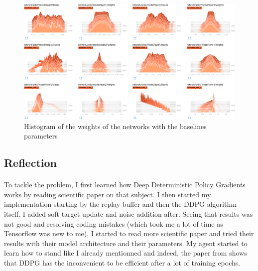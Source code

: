 \documentclass{article}
\begin{document}
\begin{figure}[ht]
  \centering
  \includegraphics[width=.8\textwidth]{histogram_baseline}
  \caption{Histogram of the weights of the networks with the baselines
    parameters}
  \label{fig:histogram_baseline}
\end{figure}

\subsection{Reflection}

\paragraph{}
To tackle the problem, I first learned how Deep Deterministic Policy Gradients works by reading
scientific paper on that subject. I then started my implementation starting by the replay buffer
and then the DDPG algorithm itself. I added soft target update and noise addition after. Seeing
that results was not good and resolving coding mistakes (which took me a lot of time as Tensorflow
was new to me), I started to read more scientific paper and tried their results with their model
architecture and their parameters. My agent started to learn how to
stand like I already mentionned and indeed, the paper from
\citeauthor{journals/corr/LillicrapHPHETS15} shows that DDPG has the
inconvenient to be efficient after a lot of training epochs. 
\end{document}
